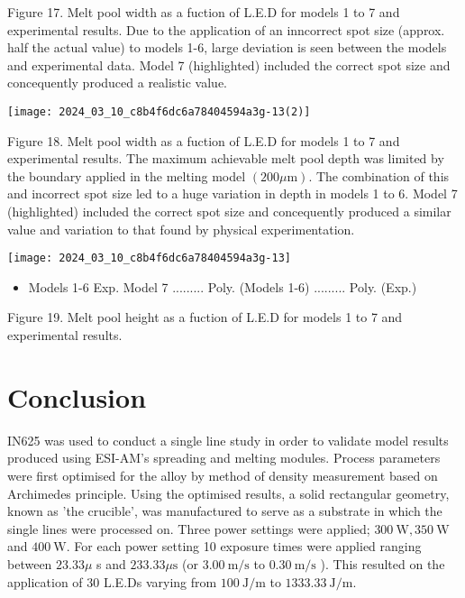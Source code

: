 \documentclass[10pt]{article}
\begin{document}
Figure 17. Melt pool width as a fuction of L.E.D for models 1 to 7 and experimental results. Due to the application of an inncorrect spot size (approx. half the actual value) to models 1-6, large deviation is seen between the models and experimental data. Model 7 (highlighted) included the correct spot size and concequently produced a realistic value.

\begin{center}
\texttt{[image: 2024\_03\_10\_c8b4f6dc6a78404594a3g-13(2)]}
\end{center}

Figure 18. Melt pool width as a fuction of L.E.D for models 1 to 7 and experimental results. The maximum achievable melt pool depth was limited by the boundary applied in the melting model $(200 \mu \mathrm{m})$. The combination of this and incorrect spot size led to a huge variation in depth in models 1 to 6. Model 7 (highlighted) included the correct spot size and concequently produced a similar value and variation to that found by physical experimentation.

\begin{center}
\texttt{[image: 2024\_03\_10\_c8b4f6dc6a78404594a3g-13]}
\end{center}

\begin{itemize}
  \item Models 1-6 Exp. Model 7 ......... Poly. (Models 1-6) ......... Poly. (Exp.)
\end{itemize}

Figure 19. Melt pool height as a fuction of L.E.D for models 1 to 7 and experimental results.

\section*{Conclusion}
IN625 was used to conduct a single line study in order to validate model results produced using ESI-AM's spreading and melting modules. Process parameters were first optimised for the alloy by method of density measurement based on Archimedes principle. Using the optimised results, a solid rectangular geometry, known as 'the crucible', was manufactured to serve as a substrate in which the single lines were processed on. Three power settings were applied; $300 \mathrm{~W}, 350 \mathrm{~W}$ and $400 \mathrm{~W}$. For each power setting 10 exposure times were applied ranging between $23.33 \mu$ s and $233.33 \mu \mathrm{s}$ (or $3.00 \mathrm{~m} / \mathrm{s}$ to $0.30 \mathrm{~m} / \mathrm{s}$ ). This resulted on the application of 30 L.E.Ds varying from $100 \mathrm{~J} / \mathrm{m}$ to $1333.33 \mathrm{~J} / \mathrm{m}$.
\end{document}
